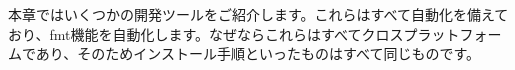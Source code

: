 本章ではいくつかの開発ツールをご紹介します。これらはすべて自動化を備えており、fmt機能を自動化します。なぜならこれらはすべてクロスプラットフォームであり、そのためインストール手順といったものはすべて同じものです。
